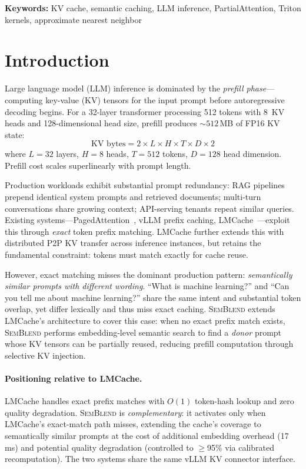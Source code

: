 \documentclass[11pt,twocolumn]{article}
\newcommand{\semblend}{\textsc{SemBlend}\xspace}
\begin{document}
\noindent\textbf{Keywords:} KV cache, semantic caching, LLM inference,
PartialAttention, Triton kernels, approximate nearest neighbor


\section{Introduction}
\label{sec:intro}

Large language model (LLM) inference is dominated by the
\emph{prefill phase}---computing key-value (KV) tensors for the input
prompt before autoregressive decoding begins. For a 32-layer
transformer processing 512 tokens with 8~KV heads and
128-dimensional head size, prefill produces ${\sim}512$\,MB of FP16 KV
state:
\begin{equation}
  \text{KV bytes} = 2 \times L \times H \times T \times D \times 2
  \label{eq:kv-size}
\end{equation}
where $L{=}32$ layers, $H{=}8$ heads, $T{=}512$ tokens, $D{=}128$ head
dimension. Prefill cost scales superlinearly with prompt length.

Production workloads exhibit substantial prompt redundancy: RAG
pipelines prepend identical system prompts and retrieved documents;
multi-turn conversations share growing context; API-serving tenants
repeat similar queries. Existing systems---PagedAttention~\cite{pagedattention},
vLLM prefix caching, LMCache~\cite{lmcache}---exploit this through
\emph{exact} token prefix matching. LMCache further extends this with
distributed P2P KV transfer across inference instances, but retains the
fundamental constraint: tokens must match exactly for cache reuse.

However, exact matching misses the dominant production pattern:
\emph{semantically similar prompts with different wording}. ``What is
machine learning?'' and ``Can you tell me about machine learning?''
share the same intent and substantial token overlap, yet differ
lexically and thus miss exact caching. \semblend extends LMCache's
architecture to cover this case: when no exact prefix match exists,
\semblend performs embedding-level semantic search to find a \emph{donor}
prompt whose KV tensors can be partially reused, reducing prefill
computation through selective KV injection.

\paragraph{Positioning relative to LMCache.}
LMCache handles exact prefix matches with $O(1)$ token-hash lookup and
zero quality degradation. \semblend is \emph{complementary}: it activates
only when LMCache's exact-match path misses, extending the cache's
coverage to semantically similar prompts at the cost of additional
embedding overhead (17\,ms) and potential quality degradation (controlled
to $\geq$95\% via calibrated recomputation). The two systems share the
same vLLM KV connector interface.
\end{document}
